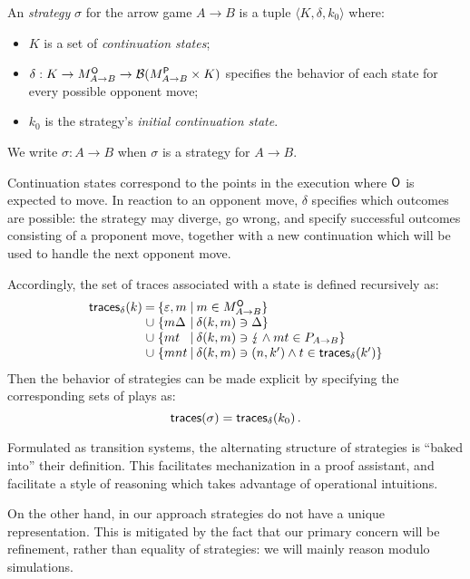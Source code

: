 \begin{definition} %
\label{def:strat}
An \emph{strategy} $\sigma$ for the arrow game $A \rightarrow B$
is a tuple
$\langle K, \delta, k_0 \rangle$
where:
\begin{itemize}
  \item $K$ is a set of \emph{continuation states};
  \item $\delta : K \rightarrow M_{A \rightarrow B}^{ \mathsf{O} } \rightarrow
                  \mathcal{B}(M_{A \rightarrow B}^{ \mathsf{P} } \times K)$
    specifies the behavior of each state
    for every possible opponent move;
  \item $k_0$
    is the strategy's \emph{initial continuation state}.
\end{itemize}
We write $\sigma : A \rightarrow B$ when $\sigma$ is a strategy
for $A \rightarrow B$.
\end{definition}

Continuation states correspond to
the points in the execution where $ \mathsf{O} $ is expected to move.
In reaction to an opponent move,
$\delta$ specifies which outcomes are possible:
the strategy may diverge, go wrong,
and specify successful outcomes
consisting of a proponent move,
together with a new continuation
which will be used to handle the next opponent move.

Accordingly,
the set of traces associated with a state is
defined recursively as:
\[
  \begin{array}{l@{\:}c@{\:\{}l@{\:\mid\:}l}
    \kw{traces}_\delta(k) & = & \varepsilon, m &
      m \in M_{A \rightarrow B}^\kw{O} \} \\
    & \cup & m \Delta &
      \delta(k, m) \ni \Delta \} \\
    & \cup & mt &
      \delta(k, m) \ni \lightning \wedge mt \in P_{A \rightarrow B} \} \\
    & \cup & m n t &
      \delta(k, m) \ni (n, k') \wedge t \in \kw{traces}_\delta(k') \}
  \end{array}
\]
Then the behavior of strategies can be made explicit
by specifying the corresponding sets of plays as:
\[
   \mathsf{traces} (\sigma) =  \mathsf{traces} _\delta(k_0) \,.
\]

Formulated as transition systems,
the alternating structure of strategies
is ``baked into'' their definition.
This facilitates
mechanization in a proof assistant,
and facilitate a style of reasoning
which takes advantage of operational intuitions.

On the other hand,
in our approach strategies do not have a unique representation.
This is mitigated by the fact that
our primary concern will be refinement,
rather than equality of strategies:
we will mainly reason modulo simulations.

